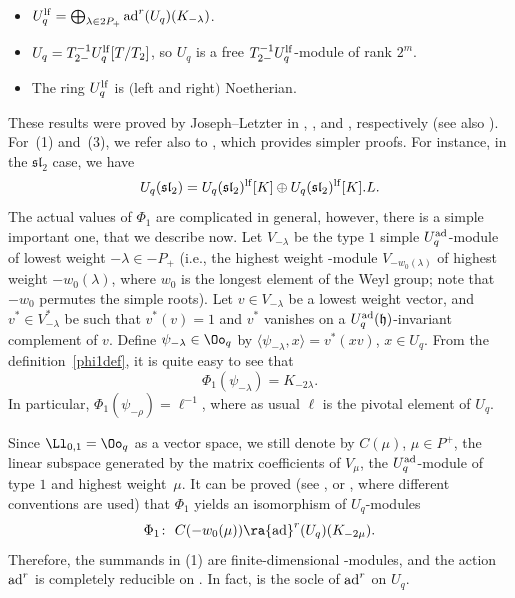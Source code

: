 \begin{teo} \label{JLteo1} \quad
\begin{itemize}\itemsep=0pt
\item[$(1)$] $U_q^{\rm lf} = \bigoplus_{\lambda \in 2P_+} {\rm ad}^r(U_q)(K_{-\lambda})$.
\item[$(2)$] $U_q = T_{2-}^{-1}U_q^{\rm lf}[T/T_{2}]$, so $U_q$ is a free $T_{2-}^{-1}U_q^{\rm lf}$-module of rank $2^m$.
\item[$(3)$] The ring $U_q^{\rm lf}$ is $($left and right$)$ Noetherian.
\end{itemize}
\end{teo}

These results were proved by Joseph--Letzter in \cite[Theorem~4.10]{JL2}, \cite[Theorem 6.4]{JL}, and \cite[Theorem~7.4.8]{Jos}, respectively (see also \cite[Sections~7.1.6, 7.1.13 and~7.1.25]{Jos}). For~(1) and~(3), we refer also to \cite[Theorems~3.113 and~3.137]{VY}, which provides simpler proofs. For instance, in the ${\mathfrak{sl}_2}$ case, we have
\[U_q({\mathfrak{sl}_2}) = U_q({\mathfrak{sl}_2})^{\rm lf}[K] \oplus U_q({\mathfrak{sl}_2})^{\rm lf}[K].L.\]
The actual values of $\Phi_1$ are complicated in general, however, there is a simple important one, that we describe now. Let $V_{-\lambda}$ be the type $1$ simple $U_q^{\rm ad}$-module of lowest weight $-\lambda\in -P_+$ (i.e., the highest weight -module $V_{-w_0(\lambda)}$ of highest weight $-w_0(\lambda)$, where $w_0$ is the longest element of the Weyl group; note that $-w_0$ permutes the simple roots). Let $v\in V_{-\lambda}$ be a lowest weight vector, and $v^*\in V_{-\lambda}^*$ be such that $v^*(v)=1$ and $v^*$ vanishes on a $U_q^{\rm ad}(\mathfrak{h})$-invariant complement of $v$. Define $\psi_{-\lambda}\in \Oo_q$ by $\langle \psi_{-\lambda},x\rangle = v^*(xv)$, $x\in U_q$. From the definition~\eqref{phi1def}, it is quite easy to see that
\begin{equation}\label{Phi1psi-}
\Phi_1(\psi_{-\lambda}) = K_{-2\lambda}.
\end{equation}
In particular, $\Phi_1(\psi_{-\rho}) = \ell^{-1}$, where as usual $\ell$ is the pivotal element of $U_q$.

\begin{Remark}\label{remsocle} Since $\Ll_{0,1}=\Oo_q$ as a vector space, we still denote by $C(\mu)$, $\mu\in P^+$, the linear subspace generated by the matrix coefficients of $V_\mu$, the $U_q^{\rm ad}$-module of type $1$ and highest weight~$\mu$. It can be proved (see \cite[Section~7.1.22]{Jos}, or \cite[p.~156]{VY}, where different conventions are used) that $\Phi_1$ yields an isomorphism of $U_q$-modules
\begin{equation}\label{restphi1}
\Phi_{1}\colon\ C(-w_0(\mu)) \ra {\rm ad}^r(U_q)(K_{-2\mu}).
\end{equation}
Therefore, the summands in (1) are finite-dimensional -modules, and the action ${\rm ad}^r$ is completely reducible on . In fact,  is the socle of ${\rm ad}^r$ on $U_q$.
\end{Remark}

